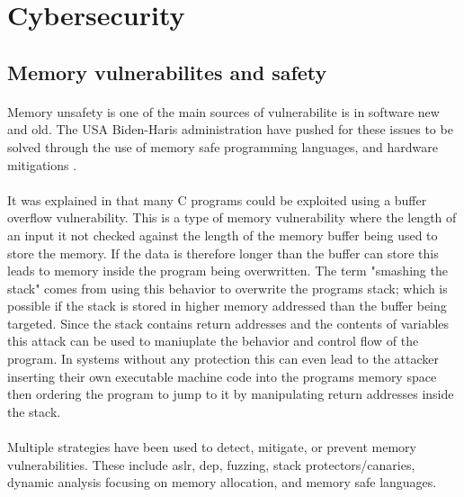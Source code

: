 \section{Cybersecurity}
\subsection{Memory vulnerabilites and safety}
\paragraph{}Memory unsafety is one of the main sources of vulnerabilite is in software new and old. The USA Biden-Haris administration have pushed for these issues to be solved through the use of memory safe programming languages, and hardware mitigations \autocite{noauthor_fact_2024}.

\paragraph{}It was explained in \cite{aleph_one_smashing_1996} that many C programs could be exploited using a buffer overflow vulnerability. This is a type of memory vulnerability where the length of an input it not checked against the length of the memory buffer being used to store the memory. If the data is therefore longer than the buffer can store this leads to memory inside the program being overwritten. The term "smashing the stack" comes from using this behavior to overwrite the programs stack; which is possible if the stack is stored in higher memory addressed than the buffer being targeted. Since the stack contains return addresses and the contents of variables this attack can be used to maniuplate the behavior and control flow of the program. In systems without any protection this can even lead to the attacker inserting their own executable machine code into the programs memory space then ordering the program to jump to it by manipulating return addresses inside the stack.

\paragraph{}Multiple strategies have been used to detect, mitigate, or prevent memory vulnerabilities. These include \acrshort{aslr}, \acrshort{dep}, fuzzing, stack protectors/canaries, dynamic analysis focusing on memory allocation, and memory safe languages.

